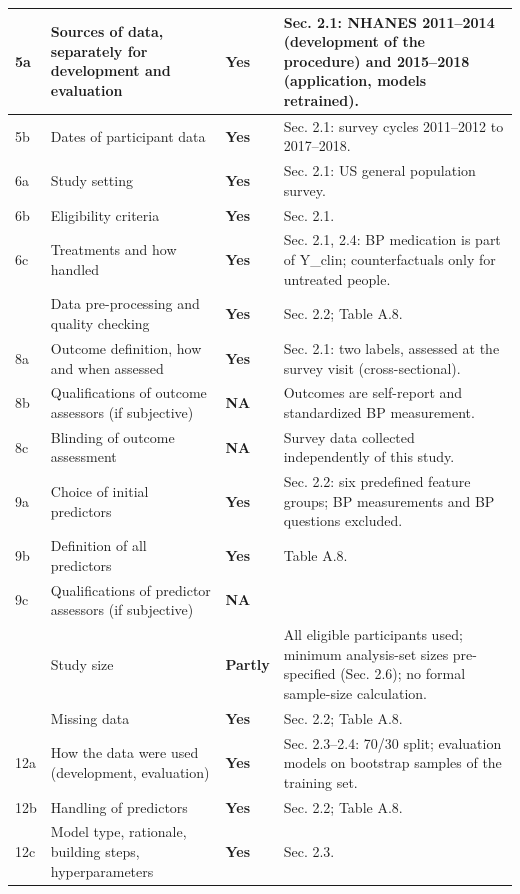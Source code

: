 \documentclass[9pt]{extarticle}
\begin{document}
\begin{longtable}{>{\raggedright\arraybackslash}p{1.0cm}>{\raggedright\arraybackslash}p{7.2cm}>{\centering\arraybackslash}p{1.4cm}>{\raggedright\arraybackslash}p{14.6cm}}
5a & Sources of data, separately for development and evaluation & \textbf{Yes} & Sec. 2.1: NHANES 2011--2014 (development of the procedure) and 2015--2018 (application, models retrained).\\ \midrule
5b & Dates of participant data & \textbf{Yes} & Sec. 2.1: survey cycles 2011--2012 to 2017--2018.\\ \midrule
6a & Study setting & \textbf{Yes} & Sec. 2.1: US general population survey.\\ \midrule
6b & Eligibility criteria & \textbf{Yes} & Sec. 2.1.\\ \midrule
6c & Treatments and how handled & \textbf{Yes} & Sec. 2.1, 2.4: BP medication is part of Y\_clin; counterfactuals only for untreated people.\\ \midrule
7 & Data pre-processing and quality checking & \textbf{Yes} & Sec. 2.2; Table A.8.\\ \midrule
8a & Outcome definition, how and when assessed & \textbf{Yes} & Sec. 2.1: two labels, assessed at the survey visit (cross-sectional).\\ \midrule
8b & Qualifications of outcome assessors (if subjective) & \textbf{NA} & Outcomes are self-report and standardized BP measurement.\\ \midrule
8c & Blinding of outcome assessment & \textbf{NA} & Survey data collected independently of this study.\\ \midrule
9a & Choice of initial predictors & \textbf{Yes} & Sec. 2.2: six predefined feature groups; BP measurements and BP questions excluded.\\ \midrule
9b & Definition of all predictors & \textbf{Yes} & Table A.8.\\ \midrule
9c & Qualifications of predictor assessors (if subjective) & \textbf{NA} & \\ \midrule
10 & Study size & \textbf{Partly} & All eligible participants used; minimum analysis-set sizes pre-specified (Sec. 2.6); no formal sample-size calculation.\\ \midrule
11 & Missing data & \textbf{Yes} & Sec. 2.2; Table A.8.\\ \midrule
12a & How the data were used (development, evaluation) & \textbf{Yes} & Sec. 2.3--2.4: 70/30 split; evaluation models on bootstrap samples of the training set.\\ \midrule
12b & Handling of predictors & \textbf{Yes} & Sec. 2.2; Table A.8.\\ \midrule
12c & Model type, rationale, building steps, hyperparameters & \textbf{Yes} & Sec. 2.3.\\ \midrule

\end{longtable}
\end{document}
